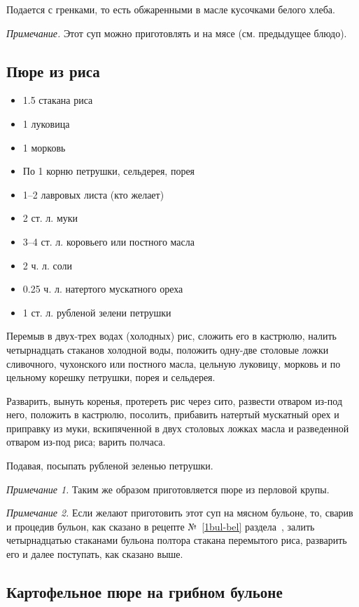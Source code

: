 Подается с гренками, то есть обжаренными в масле кусочками белого хлеба.

\emph{Примечание.} Этот суп можно приготовлять и на мясе (см. предыдущее блюдо).

\subsection{Пюре из риса}\label{5pure-ris}

\begin{itemize}
	\item 1.5 стакана риса 
    \item 1 луковица
    \item 1 морковь 
    \item По 1 корню петрушки, сельдерея, порея 
    \item 1–2 лавровых листа (кто желает)
    \item 2 ст. л. муки 
    \item 3–4 ст. л. коровьего или постного масла
    \item 2 ч. л. соли
    \item 0.25 ч. л. натертого мускатного ореха
    \item 1 ст. л. рубленой зелени петрушки
\end{itemize}

Перемыв в двух-трех водах (холодных) рис, сложить его в кастрюлю, налить четырнадцать стаканов холодной воды, положить одну-две столовые ложки сливочного, чухонского или постного масла, цельную луковицу, морковь и по цельному корешку петрушки, порея и сельдерея.

Разварить, вынуть коренья, протереть рис через сито, развести отваром из-под него, положить в кастрюлю, посолить, прибавить натертый мускатный орех и приправку из муки, вскипяченной в двух столовых ложках масла и разведенной отваром из-под риса; варить полчаса.

Подавая, посыпать рубленой зеленью петрушки.

\emph{Примечание 1.} Таким же образом приготовляется пюре из перловой крупы.

\emph{Примечание 2.} Если желают приготовить этот суп на мясном бульоне, то, сварив и процедив бульон, как сказано в рецепте №~\ref{1bul-bel} раздела~, залить четырнадцатью стаканами бульона полтора стакана перемытого риса, разварить его и далее поступать, как сказано выше.

\subsection{Картофельное пюре на грибном бульоне}\label{6kartof-grib}

